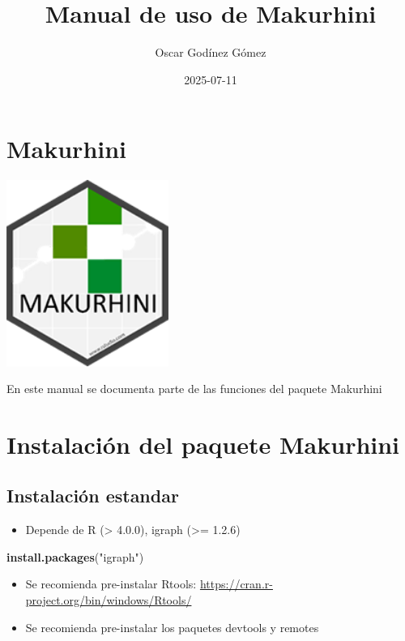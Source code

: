 \documentclass[
]{book}
\title{Manual de uso de Makurhini}
\author{Oscar Godínez Gómez}
\date{2025-07-11}
\newenvironment{Shaded}{\begin{snugshade}}{\end{snugshade}}
\newcommand{\FunctionTok}[1]{\textcolor[rgb]{0.13,0.29,0.53}{\textbf{#1}}}
\newcommand{\NormalTok}[1]{#1}
\newcommand{\StringTok}[1]{\textcolor[rgb]{0.31,0.60,0.02}{#1}}
\providecommand{\tightlist}{%
  \setlength{\itemsep}{0pt}\setlength{\parskip}{0pt}}
\begin{document}
\maketitle

{
\setcounter{tocdepth}{1}
\tableofcontents
}
\chapter*{Makurhini}\label{makurhini}

\includegraphics[width=2.08333in,height=\textheight,keepaspectratio]{LOGO_MAKHURINI.png}

En este manual se documenta parte de las funciones del paquete Makurhini

\chapter{Instalación del paquete Makurhini}\label{instalaciuxf3n-del-paquete-makurhini}

\section{Instalación estandar}\label{instalaciuxf3n-estandar}

\begin{itemize}
\tightlist
\item
  Depende de R (\textgreater{} 4.0.0), igraph (\textgreater= 1.2.6)
\end{itemize}

\begin{Shaded}
\begin{Highlighting}[]
\FunctionTok{install.packages}\NormalTok{(}\StringTok{"igraph"}\NormalTok{)}
\end{Highlighting}
\end{Shaded}

\begin{itemize}
\item
  Se recomienda pre-instalar Rtools:
  \url{https://cran.r-project.org/bin/windows/Rtools/}
\item
  Se recomienda pre-instalar los paquetes devtools y remotes
\end{itemize}
\end{document}
